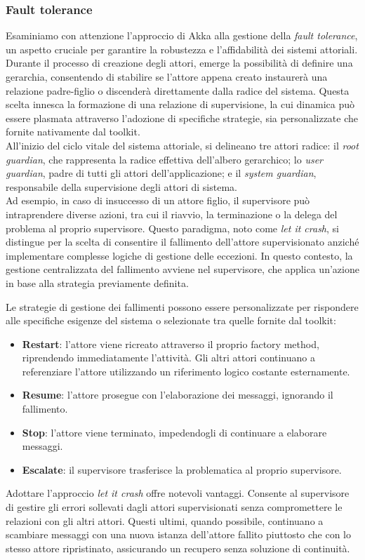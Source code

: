 \subsubsection[Fault tolerance]{Fault tolerance}
Esaminiamo con attenzione l'approccio di Akka alla gestione della \textit{fault tolerance}, un aspetto cruciale per garantire la robustezza e l'affidabilità dei sistemi attoriali.
Durante il processo di creazione degli attori, emerge la possibilità di definire una gerarchia, consentendo di stabilire se l'attore appena creato instaurerà una relazione padre-figlio o discenderà direttamente dalla radice del sistema.
Questa scelta innesca la formazione di una relazione di supervisione, la cui dinamica può essere plasmata attraverso l'adozione di specifiche strategie, sia personalizzate che fornite nativamente dal toolkit. \\
All'inizio del ciclo vitale del sistema attoriale, si delineano tre attori radice: il \textit{root guardian}, che rappresenta la radice effettiva dell'albero gerarchico; lo \textit{user guardian}, padre di tutti gli attori dell'applicazione; e il \textit{system guardian}, responsabile della supervisione degli attori di sistema. \\
Ad esempio, in caso di insuccesso di un attore figlio, il supervisore può intraprendere diverse azioni, tra cui il riavvio, la terminazione o la delega del problema al proprio supervisore.
Questo paradigma, noto come \textit{let it crash}, si distingue per la scelta di consentire il fallimento dell'attore supervisionato anziché implementare complesse logiche di gestione delle eccezioni.
In questo contesto, la gestione centralizzata del fallimento avviene nel supervisore, che applica un'azione in base alla strategia previamente definita.

Le strategie di gestione dei fallimenti possono essere personalizzate per rispondere alle specifiche esigenze del sistema o selezionate tra quelle fornite dal toolkit:
\begin{itemize}
  \item \textbf{Restart}: l'attore viene ricreato attraverso il proprio factory method, riprendendo immediatamente l'attività. Gli altri attori continuano a referenziare l'attore utilizzando un riferimento logico costante esternamente.
  \item \textbf{Resume}: l'attore prosegue con l'elaborazione dei messaggi, ignorando il fallimento.
  \item \textbf{Stop}: l'attore viene terminato, impedendogli di continuare a elaborare messaggi.
  \item \textbf{Escalate}: il supervisore trasferisce la problematica al proprio supervisore.
\end{itemize}
Adottare l'approccio \textit{let it crash} offre notevoli vantaggi.
Consente al supervisore di gestire gli errori sollevati dagli attori supervisionati senza compromettere le relazioni con gli altri attori.
Questi ultimi, quando possibile, continuano a scambiare messaggi con una nuova istanza dell'attore fallito piuttosto che con lo stesso attore ripristinato, assicurando un recupero senza soluzione di continuità. 


